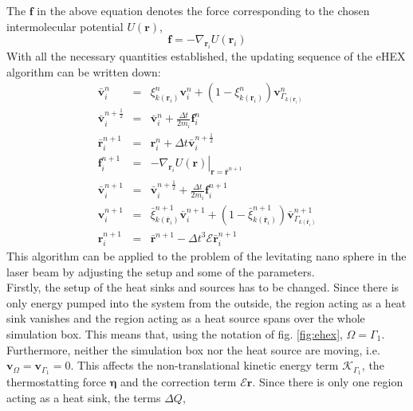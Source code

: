 \documentclass[12pt]{article}
\begin{document}
The $\mathbf{f}$ in the above equation denotes the force corresponding to the chosen intermolecular potential $U(\mathbf{r})$, 
\begin{equation}
    \mathbf{f} = -\nabla_{\mathbf{r}_i} U(\mathbf{r}_i)
\end{equation}
With all the necessary quantities established, the updating sequence of the eHEX algorithm can be written down:
\begin{subequations}
\begin{eqnarray}
    \bar{\mathbf{v}}^n_i &=& \xi^n_{k(\mathbf{r}_i)} \mathbf{v}^n_i + \left(1-\xi^n_{k(\mathbf{r}_i)}\right) \mathbf{v}^n_{\Gamma_{k(\mathbf{r}_i)}} \\
    \bar{\mathbf{v}}^{n+\frac12}_i &=& \bar{\mathbf{v}}^n_i + \frac{\Delta t}{2m_i} \mathbf{f}^n_i\\
    \bar{\mathbf{r}}^{n+1}_i &=& \mathbf{r}^n_i + \Delta t \bar{\mathbf{v}}^{n+\frac12}_i\\
    \mathbf{f}^{n+1}_i &=& \left.-\nabla_{\mathbf{r}_i} U(\mathbf{r})\right|_{\mathbf{r} = \bar{\mathbf{r}}^{n+1}}\\
    \bar{\mathbf{v}}^{n+1}_i &=& \bar{\mathbf{v}}^{n+\frac12}_i + \frac{\Delta t}{2m_i} \mathbf{f}^{n+1}_i\\
    \mathbf{v}^{n+1}_i &=& \bar{\xi}^{n+1}_{k(\bar{\mathbf{r}}_i)} \bar{\mathbf{v}}^{n+1}_i + \left(1-\bar{\xi}^{n+1}_{k(\bar{\mathbf{r}}_i)}\right)
    \bar{\mathbf{v}}^{n+1}_{\Gamma_{k(\bar{\mathbf{r}}_i)}} \\
    \mathbf{r}^{n+1}_i &=& \bar{\mathbf{r}}^{n+1} - \Delta t^3 \mathcal{E}\bar{\mathbf{r}}^{n+1}_i
\end{eqnarray}
\end{subequations}
This algorithm can be applied to the problem of the levitating nano sphere in the laser beam by adjusting the setup and some of the parameters.\\
Firstly, the setup of the heat sinks and sources has to be changed. Since there is only energy pumped into the system from the outside, the region
acting as a heat sink vanishes and the region acting as a heat source spans over the whole simulation box. This means that, using the 
notation of fig. \ref{fig:ehex}, $\Omega = \Gamma_1$. Furthermore, neither the simulation box nor the heat source are moving, i.e. 
$\mathbf{v}_\Omega = \mathbf{v}_{\Gamma_1} = 0$. This affects the non-translational kinetic energy term $\mathcal{K}_{\Gamma_1}$, the thermostatting
force $\boldsymbol{\eta}$ and the correction term $\mathcal{E}\mathbf{r}$. Since there is only one region acting as a heat sink, the terms $\Delta Q$,
\end{document}
